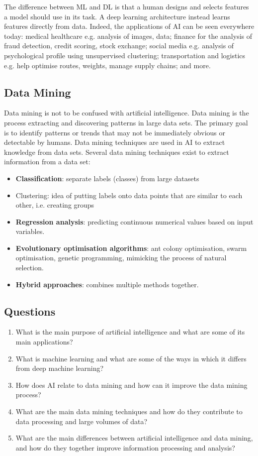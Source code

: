 \documentclass[a4paper, 12pt]{article}
\theoremstyle{plain}
\theoremstyle{definition}
\theoremstyle{remark}
\begin{document}
The difference between ML and DL is that a human designs and selects features a model should use in its task. A deep learning architecture instead learns features directly from data. Indeed, the applications of AI can be seen everywhere today: medical healthcare e.g. analysis of images, data; finance for the analysis of fraud detection, credit scoring, stock exchange; social media e.g. analysis of psychological profile using unsupervised clustering; transportation and logistics e.g. help optimise routes, weights, manage supply chains; and more.
\subsection{Data Mining}
Data mining is not to be confused with artificial intelligence. Data mining is the process extracting and discovering patterns in large data sets. The primary goal is to identify patterns or trends that may not be immediately obvious or detectable by humans. Data mining techniques are used in AI to extract knowledge from data sets. Several data mining techniques exist to extract information from a data set:
\begin{itemize}
	\item \textbf{Classification}: separate labels (classes) from large datasets
	\item Clustering: idea of putting labels onto data points that are similar to each other, i.e. creating groups
	\item \textbf{Regression analysis}: predicting continuous numerical values based on input variables.
	\item \textbf{Evolutionary optimisation algorithms}: ant colony optimisation, swarm optimisation, genetic programming, mimicking the process of natural selection.
	\item \textbf{Hybrid approaches}: combines multiple methods together.
\end{itemize}
\subsection{Questions}
\begin{enumerate}
	\item What is the main purpose of artificial intelligence and what are some of its main applications?
	\item What is machine learning and what are some of the ways in which it differs from deep machine learning?
	\item How does AI relate to data mining and how can it improve the data mining process?
	\item What are the main data mining techniques and how do they contribute to data processing and large volumes of data?
	\item What are the main differences between artificial intelligence and data mining, and how do they together improve information processing and analysis?
\end{enumerate}
\end{document}
